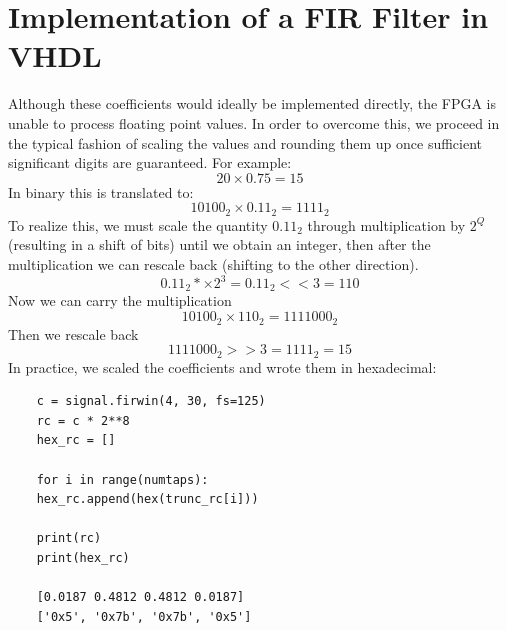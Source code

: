 \documentclass[11pt,a4paper,twocolumn]{IEEEtran}
\begin{document}
	\section{Implementation of a FIR Filter in VHDL}
	Although these coefficients would ideally be implemented directly, the FPGA is unable to process floating point values. In order to overcome this, we proceed in the typical fashion of scaling the values and rounding them up once sufficient significant digits are guaranteed.
	For example:\\$$20\times 0.75 = 15$$ In binary this is translated to:
	$$ 10100_2 \times 0.11_2 = 1111_2$$
	To realize this, we must scale the quantity $0.11_2$ through multiplication by $2^Q$ (resulting in a shift of bits) until we obtain an integer, then after the multiplication we can rescale back (shifting to the other direction).
	$$0.11_2 *\times 2^3 = 0.11_2 <<3 = 110$$
	Now we can carry the multiplication
	$$10100_2\times 110_2 = 1111000_2$$
	Then we rescale back
	$$1111000_2 >> 3 = 1111_2 = 15$$
	In practice, we scaled the coefficients and wrote them in hexadecimal:
	\begin{lstlisting}
	c = signal.firwin(4, 30, fs=125)
	rc = c * 2**8
	hex_rc = []
	
	for i in range(numtaps):
	hex_rc.append(hex(trunc_rc[i]))
	
	print(rc)    
	print(hex_rc)
	
	[0.0187 0.4812 0.4812 0.0187]
	['0x5', '0x7b', '0x7b', '0x5']
	\end{lstlisting}
\end{document}
